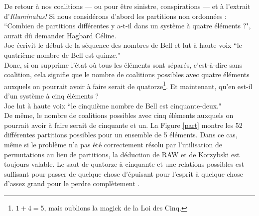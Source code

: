 De retour à nos coalitions --- ou pour être sinistre, conspirations --- et à l'extrait d'\textit{Illuminatus!} Si nous considérons d'abord les partitions non ordonnées : ``Combien de partitions différentes y a-t-il dans un système à quatre éléments ?", aurait dû demander Hagbard Céline.\\
Joe écrivit le début de la séquence des nombres de Bell et lut à haute voix ``le quatrième nombre de Bell est quinze."\\
Donc, si on supprime l'état où tous les éléments sont séparés, c'est-à-dire sans coalition, cela signifie que le nombre de coalitions possibles avec quatre éléments auxquels on pourrait avoir à faire serait de quatorze\footnote{$1+4=5$, mais oublions la magick de la Loi des Cinq\cite{Malaclypse1963}.}. Et maintenant, qu'en est-il d'un système à cinq éléments ?\\
Joe lut à haute voix ``le cinquième nombre de Bell est cinquante-deux."\\
De même, le nombre de coalitions possibles avec cinq éléments auxquels on pourrait avoir à faire serait de cinquante et un. La Figure \ref{part} montre les 52 différentes partitions possibles pour un ensemble de 5 éléments.
Dans ce cas, même si le problème n'a pas été correctement résolu par l'utilisation de permutations au lieu de partitions, la déduction de RAW et de Korzybski est toujours valable. 
Le saut de quatorze à cinquante et une relations possibles est suffisant pour passer de quelque chose d'épuisant pour l'esprit à quelque chose d'assez grand pour le perdre complètement \cite{Kelly1955, Korzybski1933}. \\

